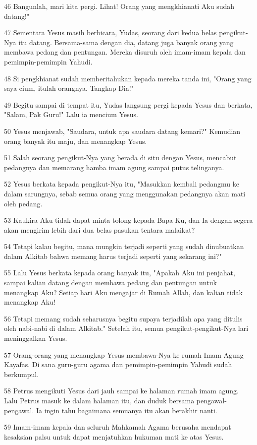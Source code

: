 \par 46 Bangunlah, mari kita pergi. Lihat! Orang yang mengkhianati Aku sudah datang!"
\par 47 Sementara Yesus masih berbicara, Yudas, seorang dari kedua belas pengikut-Nya itu datang. Bersama-sama dengan dia, datang juga banyak orang yang membawa pedang dan pentungan. Mereka disuruh oleh imam-imam kepala dan pemimpin-pemimpin Yahudi.
\par 48 Si pengkhianat sudah memberitahukan kepada mereka tanda ini, "Orang yang saya cium, itulah orangnya. Tangkap Dia!"
\par 49 Begitu sampai di tempat itu, Yudas langsung pergi kepada Yesus dan berkata, "Salam, Pak Guru!" Lalu ia mencium Yesus.
\par 50 Yesus menjawab, "Saudara, untuk apa saudara datang kemari?" Kemudian orang banyak itu maju, dan menangkap Yesus.
\par 51 Salah seorang pengikut-Nya yang berada di situ dengan Yesus, mencabut pedangnya dan memarang hamba imam agung sampai putus telinganya.
\par 52 Yesus berkata kepada pengikut-Nya itu, "Masukkan kembali pedangmu ke dalam sarungnya, sebab semua orang yang menggunakan pedangnya akan mati oleh pedang.
\par 53 Kaukira Aku tidak dapat minta tolong kepada Bapa-Ku, dan Ia dengan segera akan mengirim lebih dari dua belas pasukan tentara malaikat?
\par 54 Tetapi kalau begitu, mana mungkin terjadi seperti yang sudah dinubuatkan dalam Alkitab bahwa memang harus terjadi seperti yang sekarang ini?"
\par 55 Lalu Yesus berkata kepada orang banyak itu, "Apakah Aku ini penjahat, sampai kalian datang dengan membawa pedang dan pentungan untuk menangkap Aku? Setiap hari Aku mengajar di Rumah Allah, dan kalian tidak menangkap Aku!
\par 56 Tetapi memang sudah seharusnya begitu supaya terjadilah apa yang ditulis oleh nabi-nabi di dalam Alkitab." Setelah itu, semua pengikut-pengikut-Nya lari meninggalkan Yesus.
\par 57 Orang-orang yang menangkap Yesus membawa-Nya ke rumah Imam Agung Kayafas. Di sana guru-guru agama dan pemimpin-pemimpin Yahudi sudah berkumpul.
\par 58 Petrus mengikuti Yesus dari jauh sampai ke halaman rumah imam agung. Lalu Petrus masuk ke dalam halaman itu, dan duduk bersama pengawal-pengawal. Ia ingin tahu bagaimana semuanya itu akan berakhir nanti.
\par 59 Imam-imam kepala dan seluruh Mahkamah Agama berusaha mendapat kesaksian palsu untuk dapat menjatuhkan hukuman mati ke atas Yesus.
